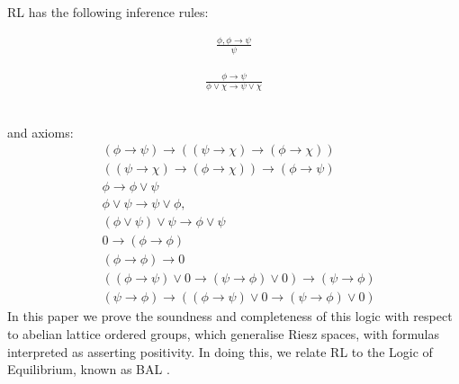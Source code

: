 \documentclass[journal]{IEEEtran}
\theoremstyle{definition}
\begin{document}




RL has the following inference rules:\\
\begin{minipage}{0.49\columnwidth}
\begin{gather}
  \tag{MP} \frac{\phi, \phi \rightarrow \psi}{\psi}
\end{gather}
\end{minipage}
\begin{minipage}{0.49\columnwidth}
\begin{gather}
  \tag{RI} \frac{\phi \rightarrow \psi}{\phi \lor \chi \rightarrow \psi \lor \chi}
\end{gather}
\end{minipage}
\vspace{0.3cm}\\
and axioms:
\begin{align}
  \tag{R1a} &(\phi \rightarrow \psi) \rightarrow ((\psi \rightarrow \chi)
  \rightarrow (\phi \rightarrow \chi))\\
  \tag{R1b} &((\psi \rightarrow \chi) \rightarrow (\phi \rightarrow
  \chi)) \rightarrow (\phi \rightarrow \psi)\\
  \tag{R2} &\phi \rightarrow \phi \lor \psi\\
  \tag{R3} &\phi \lor \psi \rightarrow \psi \lor \phi,\\
  \tag{R4} &(\phi \lor \psi)\lor \psi \rightarrow \phi \lor \psi\\
  \tag{R5a} &0 \rightarrow (\phi \rightarrow \phi)\\
  \tag{R5b} &(\phi \rightarrow\phi) \rightarrow 0\\
  \tag{R6a} &((\phi \rightarrow \psi)\lor 0 \rightarrow (\psi \rightarrow \phi) \lor 0) \rightarrow (\psi \rightarrow \phi)\\
  \tag{R6b} & (\psi \rightarrow \phi) \rightarrow ((\phi \rightarrow \psi)\lor 0 \rightarrow (\psi \rightarrow \phi) \lor 0)
\end{align}
In this paper we prove the soundness and completeness of this logic
with respect to abelian lattice ordered groups, which generalise Riesz
spaces, with formulas interpreted as asserting positivity. In doing
this, we relate RL to the Logic of Equilibrium, known as BAL
\cite{Galli:04}.
\end{document}
